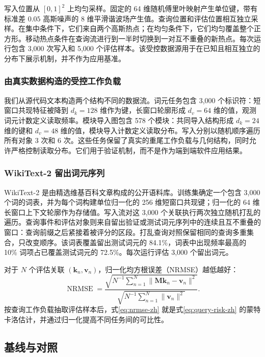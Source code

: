 \documentclass[11pt,a4paper]{ctexart}
\newcommand{\M}{\bm{M}}
\newcommand{\kvec}{\bm{k}}
\newcommand{\vvec}{\bm{v}}
\newcommand{\norm}[1]{\lVert#1\rVert}
\begin{document}
写入位置从 $[0,1]^2$ 上均匀采样。固定的 64 维随机傅里叶映射产生单位键，带有标准差 $0.05$ 高斯噪声的 8 维平滑谐波场产生值。查询位置和评估位置相互独立采样。在集中条件下，它们来自两个高斯热点；在均匀条件下，它们均匀覆盖整个正方形。移动热点条件在查询流进行到一半时切换到一对互不重叠的新热点。每次运行包含 3,000 次写入和 5,000 个评估样本。该受控数据源用于在已知且相互独立的分布下展示机制，并不作为应用基准。

\subsubsection{由真实数据构造的受控工作负载}

我们从源代码文本构造两个结构不同的数据流。词元任务包含 3,000 个标识符：短窗口共现特征被降到 $d_k=128$ 维作为键，长窗口轮廓形成 $d_v=64$ 维的值，观测词元计数定义读取频率。模块导入图包含 578 个模块：共同导入结构形成 $d_k=24$ 维的键和 $d_v=48$ 维的值，模块导入计数定义读取分布。写入分别以随机顺序遍历所有对象 3 次和 6 次。这些任务保留了真实的重尾工作负载与几何结构，同时允许严格控制读取分布。它们用于验证机制，而不是作为端到端软件应用结果。

\subsubsection{WikiText-2 留出词元序列}

WikiText-2 是由精选维基百科文章构成的公开语料库\cite{merity2016wikitext}。训练集确定一个包含 3,000 个词的词表，并为每个词构建单位归一化的 256 维短窗口共现键；归一化的 64 维长窗口上下文轮廓作为存储值。写入流对这 3,000 个关联执行两次独立随机打乱的遍历。查询事件和评估对象则来自留出验证或测试词元序列中的连续且互不重叠的窗口：查询前缀之后紧接着被评分的区段。打乱查询对照保留相同的查询多重集合，只改变顺序。该词表覆盖留出测试词元的 84.1\%，词表中出现频率最高的 10\% 词项占已覆盖测试词元的 72.5\%。每次运行评估 3,000 个留出词元。

对于 $N$ 个评估关联 $(\kvec_n,\vvec_n)$，归一化均方根误差（NRMSE）越低越好：
\begin{equation}
 \operatorname{NRMSE}=
 \frac{\sqrt{N^{-1}\sum_{n=1}^{N}\norm{\M\kvec_n-\vvec_n}^{2}}}
 {\sqrt{N^{-1}\sum_{n=1}^{N}\norm{\vvec_n}^{2}}}.
 \label{eq:nrmse-zh}
\end{equation}
按查询工作负载抽取评估样本后，式\eqref{eq:nrmse-zh} 就是式\eqref{eq:query-risk-zh} 的蒙特卡洛估计，并通过归一化提高不同任务间的可比性。

\subsection{基线与对照}
\end{document}
